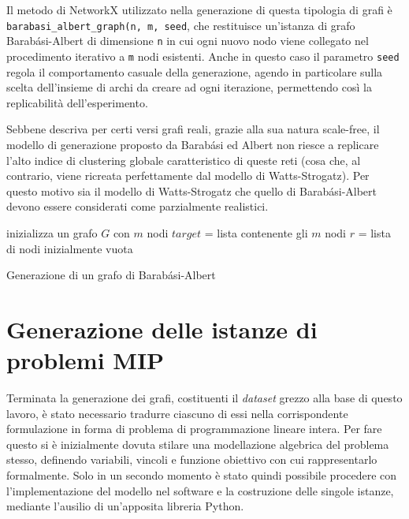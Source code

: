 Il metodo di NetworkX utilizzato nella generazione di questa tipologia di grafi è\\
\texttt{barabasi\_albert\_graph(n, m, seed}, che restituisce un'istanza di grafo Barabási-Albert di dimensione \texttt{n} in cui ogni nuovo nodo viene collegato nel procedimento iterativo a \texttt{m} nodi esistenti. Anche in questo caso il parametro \texttt{seed} regola il comportamento casuale della generazione, agendo in particolare sulla scelta dell'insieme di archi da creare ad ogni iterazione, permettendo così la replicabilità dell'esperimento. 

Sebbene descriva per certi versi grafi reali, grazie alla sua natura scale-free, il modello di generazione proposto da Barabási ed Albert non riesce a replicare l'alto indice di clustering globale caratteristico di queste reti (cosa che, al contrario, viene ricreata perfettamente dal modello di Watts-Strogatz). Per questo motivo sia il modello di Watts-Strogatz che quello di Barabási-Albert devono essere considerati come parzialmente realistici.

\begin{algorithm}
\SetAlgoLined
{}
 inizializza un grafo $G$ con $m$ nodi\;
 $target$ = lista contenente gli $m$ nodi\;
 $r$ = lista di nodi inizialmente vuota\;
 \caption{Generazione di un grafo di Barabási-Albert}
 \label{alg:bag}
\end{algorithm}

\newpage
\section{Generazione delle istanze di problemi MIP}
Terminata la generazione dei grafi, costituenti il \textit{dataset} grezzo alla base di questo lavoro, è stato necessario tradurre ciascuno di essi nella corrispondente formulazione in forma di problema di programmazione lineare intera. Per fare questo si è inizialmente dovuta stilare una modellazione algebrica del problema stesso, definendo variabili, vincoli e funzione obiettivo con cui rappresentarlo formalmente. Solo in un secondo momento è stato quindi possibile procedere con l'implementazione del modello nel software e la costruzione delle singole istanze, mediante l'ausilio di un'apposita libreria Python.


